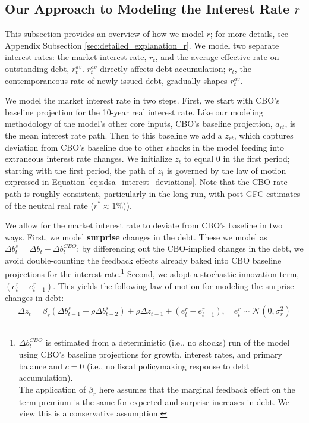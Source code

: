 \documentclass[12pt]{article}
\begin{document}
\subsection{Our Approach to Modeling the Interest Rate $r$}
This subsection provides an overview of how we model $r$; for more details, see Appendix Subsection \ref{sec:detailed_explanation_r}. We model two separate interest rates: the market interest rate, $r_t$, and the average effective rate on outstanding debt, $r^{av}_t$. $r^{av}_t$ directly affects debt accumulation; $r_t$, the contemporaneous rate of newly issued debt, gradually shapes $r^{av}_t$.

We model the market interest rate in two steps. First, we start with CBO's baseline projection for the 10-year real interest rate. Like our modeling methodology of the model's other core inputs, CBO's baseline projection, $a_{rt}$, is the mean interest rate path. Then to this baseline we add a $z_{rt}$, which captures deviation from CBO's baseline due to other shocks in the model feeding into extraneous interest rate changes. We initialize $z_t$ to equal 0 in the first period; starting with the first period, the path of $z_t$ is governed by the law of motion expressed in Equation \ref{eq:sdsa_interest_deviations}. Note that the CBO rate path is roughly consistent, particularly in the long run, with post-GFC estimates of the neutral real rate ($r^* \approx 1\%)$). 

We allow for the market interest rate to deviate from CBO's baseline in two ways. First, we model \textbf{surprise} changes in the debt. These we model as $\Delta b^s_t = \Delta b_t - \Delta b^{CBO}_t$; by differencing out the CBO-implied changes in the debt, we avoid double-counting the feedback effects already baked into CBO baseline projections for the interest rate.\footnote{$\Delta b^{CBO}_t$ is estimated from a deterministic (i.e., no shocks) run of the model using CBO's baseline projections for growth, interest rates, and primary balance and $c = 0$ (i.e., no fiscal policymaking response to debt accumulation). \\ The application of $\beta_r$ here assumes that the marginal feedback effect on the term premium is the same for expected and surprise increases in debt. We view this is a conservative assumption.} Second, we adopt a stochastic innovation term, $(e^r_t - e^r_{t-1})$. This yields the following law of motion for modeling the surprise changes in debt:
\begin{gather}
        \Delta z_t = \beta_r (\Delta b^s_{t-1} - \rho \Delta b^s_{t-2}) + \rho \Delta z_{t-1} + (e^r_t - e^r_{t-1}),\quad e^r_t \sim \mathcal{N}(0, \sigma^2_r)
\end{gather}
\end{document}
